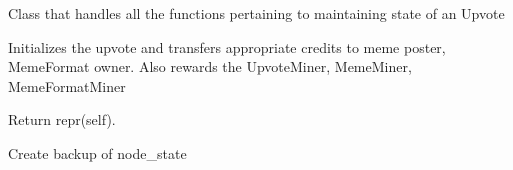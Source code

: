 \documentclass[letterpaper,10pt,english]{sphinxmanual}
\begin{document}
\begin{fulllineitems}
\label{\detokenize{index:node_state.Upvote}}
Class that handles all the functions pertaining to maintaining state
of an Upvote

\begin{fulllineitems}
\label{\detokenize{index:node_state.Upvote.__init__}}
Initializes the upvote and transfers appropriate credits to meme
poster, MemeFormat owner. Also rewards the UpvoteMiner,
MemeMiner, MemeFormatMiner

\end{fulllineitems}


\begin{fulllineitems}
\label{\detokenize{index:node_state.Upvote.__repr__}}
Return repr(self).

\end{fulllineitems}


\end{fulllineitems}


\begin{fulllineitems}
\label{\detokenize{index:node_state.backup_state}}
Create backup of node\_state

\end{fulllineitems}
\end{document}

